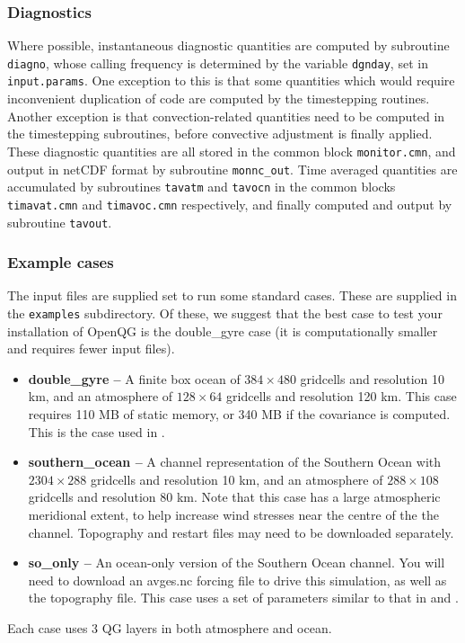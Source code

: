 \documentclass[11pt, a4paper,twoside]{article}
\numberwithin{equation}{section}
\begin{document}
\subsubsection{Diagnostics}
Where possible, instantaneous diagnostic quantities are computed by subroutine \verb=diagno=, whose calling frequency is determined by the variable \verb=dgnday=, set in \verb=input.params=.
One exception to this is that some quantities which would require inconvenient duplication of code are computed by the timestepping routines.
Another exception is that convection-related quantities need to be computed in the timestepping subroutines, before convective adjustment is finally applied.
These diagnostic quantities are all stored in the common block \verb=monitor.cmn=, and output in netCDF format by subroutine \verb=monnc_out=.
Time averaged quantities are accumulated by subroutines \verb=tavatm= and \verb=tavocn= in the common blocks \verb=timavat.cmn= and \verb=timavoc.cmn= respectively, and finally computed and output by subroutine \verb=tavout=.


\subsubsection{Example cases}\label{sec:examples}
The input files are supplied set to run some standard cases. 
These are supplied in the \verb=examples= subdirectory.
Of these, we suggest that the best case to test your installation of OpenQG is the double\_gyre case (it is computationally smaller and requires fewer input files).
\begin{itemize}
  \item \textbf{double\_gyre --} A finite box ocean of $384 \times 480$ gridcells and resolution 10 km, and an atmosphere of $128 \times 64$ gridcells and resolution 120 km.
This case requires 110 MB of static memory, or 340 MB if the covariance is computed.
This is the case used in \citet{hogg:06a}. 
  \item \textbf{southern\_ocean --} A channel representation of the Southern Ocean with $2304 \times 288 $ gridcells and resolution 10 km, and an atmosphere of $288 \times 108$ gridcells and resolution 80 km.
  Note that this case has a large atmospheric meridional extent, to help increase wind stresses near the centre of the the channel.
Topography and restart files may need to be downloaded separately.
\item \textbf{so\_only --} An ocean-only version of the Southern Ocean channel. You will need to download an avges.nc forcing file to drive this simulation, as well as the topography file.
This case uses a set of parameters similar to that in \citet{hogg:08b} and \citet{hutchinson:10}.
\end{itemize}  
Each case uses 3 QG layers in both atmosphere and ocean.
\end{document}
